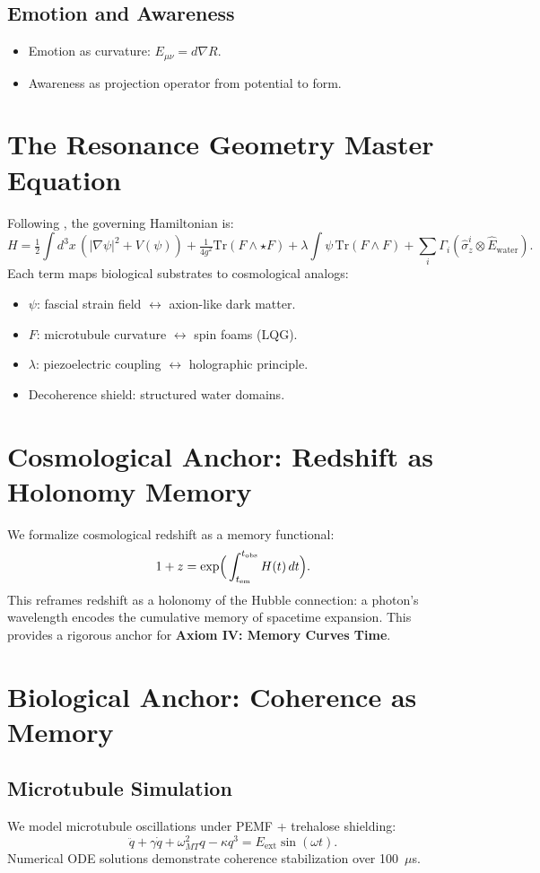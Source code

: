 \documentclass[11pt]{article}
\begin{document}
\subsection{Emotion and Awareness}
\begin{itemize}
    \item Emotion as curvature: $E_{\mu\nu} = d\nabla R$.
    \item Awareness as projection operator from potential to form.
\end{itemize}

\section{The Resonance Geometry Master Equation}
Following \cite{MasterEQ420}, the governing Hamiltonian is:
\[
H = \tfrac{1}{2} \int d^3x \, (|\nabla \psi|^2 + V(\psi))
+ \tfrac{1}{4g^2} \mathrm{Tr}(F \wedge \star F)
+ \lambda \int \psi \, \mathrm{Tr}(F \wedge F)
+ \sum_i \Gamma_i (\hat{\sigma}_z^i \otimes \hat{E}_{\text{water}}).
\]
Each term maps biological substrates to cosmological analogs:
\begin{itemize}
    \item $\psi$: fascial strain field $\leftrightarrow$ axion-like dark matter.
    \item $F$: microtubule curvature $\leftrightarrow$ spin foams (LQG).
    \item $\lambda$: piezoelectric coupling $\leftrightarrow$ holographic principle.
    \item Decoherence shield: structured water domains.
\end{itemize}

\section{Cosmological Anchor: Redshift as Holonomy Memory}
We formalize cosmological redshift as a memory functional:
\[
1+z = \exp\!\Big(\int_{t_{\rm em}}^{t_{\rm obs}} H(t)\,dt\Big).
\]
This reframes redshift as a holonomy of the Hubble connection: 
a photon’s wavelength encodes the cumulative memory of spacetime expansion.
This provides a rigorous anchor for \textbf{Axiom IV: Memory Curves Time}.

\section{Biological Anchor: Coherence as Memory}
\subsection{Microtubule Simulation}
We model microtubule oscillations under PEMF + trehalose shielding:
\[
\ddot{q} + \gamma \dot{q} + \omega_{MT}^2 q - \kappa q^3 = E_{\text{ext}}\sin(\omega t).
\]
Numerical ODE solutions demonstrate coherence stabilization over 100~$\mu$s.
\end{document}
